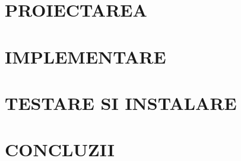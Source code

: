 \documentclass[a4paper,12pt]{article}
\begin{document}
    \section{\Large\centering\uppercase{Proiectarea}}

    \section{\Large\centering\uppercase{Implementare}}

    \section{\Large\centering\uppercase{Testare si instalare}}

    \section{\Large\centering\uppercase{Concluzii}}

    \section*{\Large{}}
 
    
\end{document}
